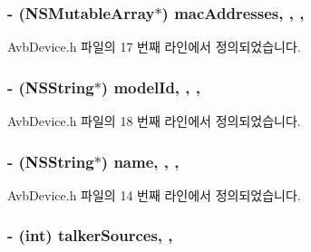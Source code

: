\subsubsection[{\texorpdfstring{mac\+Addresses}{macAddresses}}]{\setlength{\rightskip}{0pt plus 5cm}-\/ (N\+S\+Mutable\+Array$\ast$) mac\+Addresses\hspace{0.3cm}{\ttfamily [read]}, {\ttfamily [write]}, {\ttfamily [atomic]}, {\ttfamily [copy]}}\hypertarget{interface_avb_device_aed759aa4d0b84001e8542cbf2a659617}{}\label{interface_avb_device_aed759aa4d0b84001e8542cbf2a659617}


Avb\+Device.\+h 파일의 17 번째 라인에서 정의되었습니다.

\subsubsection[{\texorpdfstring{model\+Id}{modelId}}]{\setlength{\rightskip}{0pt plus 5cm}-\/ (N\+S\+String$\ast$) model\+Id\hspace{0.3cm}{\ttfamily [read]}, {\ttfamily [write]}, {\ttfamily [atomic]}, {\ttfamily [copy]}}\hypertarget{interface_avb_device_ab91711bbaee9c1176ecc405d854068a3}{}\label{interface_avb_device_ab91711bbaee9c1176ecc405d854068a3}


Avb\+Device.\+h 파일의 18 번째 라인에서 정의되었습니다.

\subsubsection[{\texorpdfstring{name}{name}}]{\setlength{\rightskip}{0pt plus 5cm}-\/ (N\+S\+String$\ast$) name\hspace{0.3cm}{\ttfamily [read]}, {\ttfamily [write]}, {\ttfamily [atomic]}, {\ttfamily [copy]}}\hypertarget{interface_avb_device_a4b93d352d2fca75b34e1b5a50e03f587}{}\label{interface_avb_device_a4b93d352d2fca75b34e1b5a50e03f587}


Avb\+Device.\+h 파일의 14 번째 라인에서 정의되었습니다.

\subsubsection[{\texorpdfstring{talker\+Sources}{talkerSources}}]{\setlength{\rightskip}{0pt plus 5cm}-\/ (int) talker\+Sources\hspace{0.3cm}{\ttfamily [read]}, {\ttfamily [write]}, {\ttfamily [atomic]}}\hypertarget{interface_avb_device_a1ff74356f706ed929507e85dcf71b076}{}\label{interface_avb_device_a1ff74356f706ed929507e85dcf71b076}


